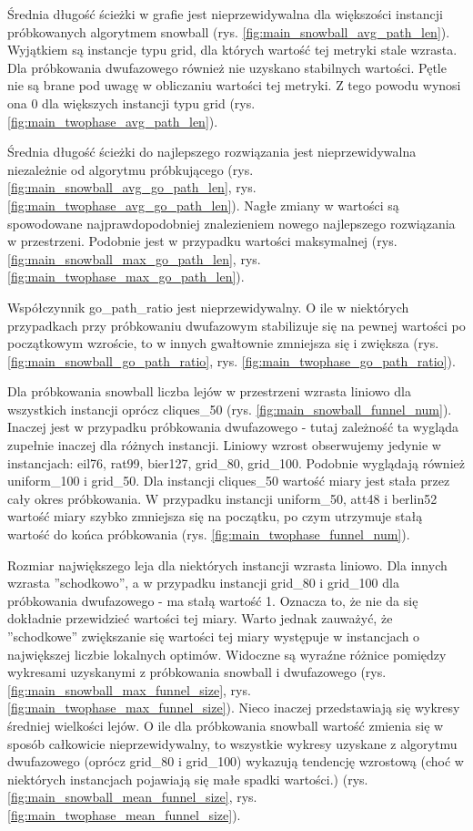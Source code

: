 Średnia długość ścieżki w grafie jest nieprzewidywalna dla większości instancji próbkowanych algorytmem snowball (rys. \ref{fig:main_snowball_avg_path_len}).
Wyjątkiem są instancje typu grid, dla których wartość tej metryki stale wzrasta.
Dla próbkowania dwufazowego również nie uzyskano stabilnych wartości.
Pętle nie są brane pod uwagę w obliczaniu wartości tej metryki. Z tego powodu wynosi ona 0 dla większych instancji typu grid (rys. \ref{fig:main_twophase_avg_path_len}).

Średnia długość ścieżki do najlepszego rozwiązania jest nieprzewidywalna niezależnie od algorytmu próbkującego (rys. \ref{fig:main_snowball_avg_go_path_len}, rys. \ref{fig:main_twophase_avg_go_path_len}).
Nagłe zmiany w wartości są spowodowane najprawdopodobniej znalezieniem nowego najlepszego rozwiązania w przestrzeni.
Podobnie jest w przypadku wartości maksymalnej (rys. \ref{fig:main_snowball_max_go_path_len}, rys. \ref{fig:main_twophase_max_go_path_len}).

Współczynnik go\_path\_ratio jest nieprzewidywalny. O ile w niektórych przypadkach przy próbkowaniu dwufazowym stabilizuje się na pewnej wartości
po początkowym wzroście, to w innych gwałtownie zmniejsza się i zwiększa (rys. \ref{fig:main_snowball_go_path_ratio}, rys. \ref{fig:main_twophase_go_path_ratio}). 

Dla próbkowania snowball liczba lejów w przestrzeni wzrasta liniowo dla wszystkich instancji oprócz cliques\_50 (rys. \ref{fig:main_snowball_funnel_num}).
Inaczej jest w przypadku próbkowania dwufazowego - tutaj zależność ta wygląda zupełnie inaczej dla różnych instancji.
Liniowy wzrost obserwujemy jedynie w instancjach: eil76, rat99, bier127, grid\_80, grid\_100. Podobnie wyglądają również uniform\_100 i grid\_50.
Dla instancji cliques\_50 wartość miary jest stała przez cały okres próbkowania. W przypadku instancji uniform\_50, att48 i berlin52 wartość miary
szybko zmniejsza się na początku, po czym utrzymuje stałą wartość do końca próbkowania (rys. \ref{fig:main_twophase_funnel_num}).

Rozmiar największego leja dla niektórych instancji wzrasta liniowo. Dla innych wzrasta ''schodkowo'', a w przypadku instancji grid\_80 i grid\_100 dla
próbkowania dwufazowego - ma stałą wartość 1. Oznacza to, że nie da się dokładnie przewidzieć wartości tej miary. Warto jednak zauważyć, że
''schodkowe'' zwiększanie się wartości tej miary występuje w instancjach o największej liczbie lokalnych optimów.
Widoczne są wyraźne różnice pomiędzy wykresami uzyskanymi z próbkowania snowball i dwufazowego (rys. \ref{fig:main_snowball_max_funnel_size}, rys. \ref{fig:main_twophase_max_funnel_size}).
Nieco inaczej przedstawiają się wykresy średniej wielkości lejów. O ile dla próbkowania snowball wartość zmienia się w sposób całkowicie nieprzewidywalny,
to wszystkie wykresy uzyskane z algorytmu dwufazowego (oprócz grid\_80 i grid\_100) wykazują tendencję wzrostową (choć w niektórych instancjach pojawiają się małe spadki wartości.)
(rys. \ref{fig:main_snowball_mean_funnel_size}, rys. \ref{fig:main_twophase_mean_funnel_size}).

